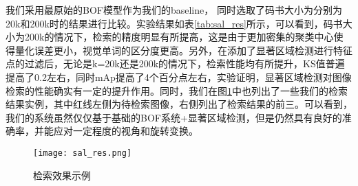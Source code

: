 我们采用最原始的BOF模型作为我们的baseline， 同时选取了码书大小为分别为20k和200k时的结果进行比较。实验结果如表\ref{tab:sal_res}所示，可以看到，码书大小为200k的情况下，检索的精度明显有所提高，这是由于更加密集的聚类中心使得量化误差更小，视觉单词的区分度更高。另外，在添加了显著区域检测进行特征点的过滤后，无论是k=20k还是200k的情况下，检索性能均有所提升，KS值普遍提高了0.2左右，同时mAp提高了4个百分点左右，实验证明，显著区域检测对图像检索的性能确实有一定的提升作用。同时，我们在图\ref{fig:sal_res}中也列出了一些我们的检索结果实例，其中红线左侧为待检索图像，右侧列出了检索结果的前三。可以看到，我们的系统虽然仅仅基于基础的BOF系统+显著区域检测，但是仍然具有良好的准确率，并能应对一定程度的视角和旋转变换。

\begin{figure}[h]
\centering
\texttt{[image: sal\_res.png]}
\caption{检索效果示例}\label{fig:sal_res}
\end{figure}

